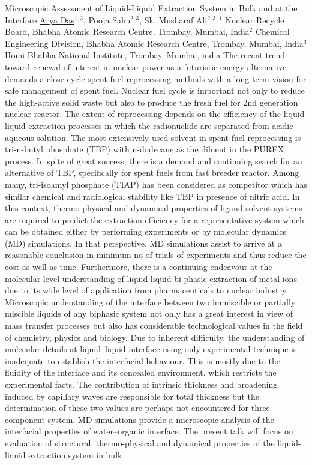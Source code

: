 
    \begin{abstract_online}{Microscopic Assessment of Liquid-Liquid Extraction System in Bulk and at the Interface}{%
        \underline{Arya Das}$^{1, 3}$, Pooja Sahu$^{2, 3}$, Sk. Musharaf Ali$^{2, 3}$}{%
        \IStag}{%
        $^1$ Nuclear Recycle Board, Bhabha Atomic Research Centre, Trombay, Mumbai, India\newline{}$^2$ Chemical Engineering Division, Bhabha Atomic Research Centre, Trombay, Mumbai, India\newline{}$^3$ Homi Bhabha National Institute, Trombay, Mumbai, india}
    The recent trend toward renewal of interest in nuclear power as a futuristic energy alternative demands a close cycle spent fuel  reprocessing  methods  with  a  long  term  vision  for  safe management of  spent  fuel.  Nuclear fuel cycle is important not only to reduce the high-active solid waste but also to produce the fresh fuel for 2nd generation nuclear reactor. The extent of reprocessing depends on the efficiency of the liquid-liquid extraction processes in which the radionuclide are separated from acidic aqueous solution. The most extensively used solvent in spent fuel reprocessing is tri-n-butyl phosphate (TBP) with n-dodecane as the diluent in the PUREX process. In spite of great success, there is a demand and continuing search for an alternative of TBP, specifically for spent fuels from fast  breeder reactor. Among many, tri-isoamyl phosphate (TIAP) has been considered as competitor which has similar chemical and radiological stability like TBP in presence of nitric acid. In this context, thermo-physical and dynamical properties of ligand-solvent systems are required to predict the extraction efficiency for a representative system which can be obtained either by performing experiments or by molecular dynamics (MD) simulations. In that perspective, MD simulations assist to arrive at a reasonable conclusion in minimum no of trials of experiments and thus reduce the cost as well as time. Furthermore, there is a continuing endeavour  at the molecular level understanding of liquid-liquid bi-phasic extraction of metal ions due to its wide level of application from pharmaceuticals to nuclear industry. Microscopic understanding of the interface between two immiscible or partially miscible liquids of any biphasic system not only has a great interest in view of mass transfer processes but also has considerable technological values in the field of chemistry, physics and biology. Due to inherent difficulty, the understanding of molecular details at liquid–liquid interface using only experimental technique is inadequate to establish the interfacial behaviour. This is mostly due to the fluidity of the interface and its concealed environment, which restricts the experimental facts. The contribution of intrinsic thickness and broadening induced by capillary waves are responsible for total thickness but the determination of these two values are perhaps not encountered for three component system. MD simulations provide a microscopic analysis of the interfacial properties of water–organic interface. The present talk will focus on evaluation of structural, thermo-physical and dynamical properties of the liquid-liquid extraction system in bulk 
\end{abstract_online}
